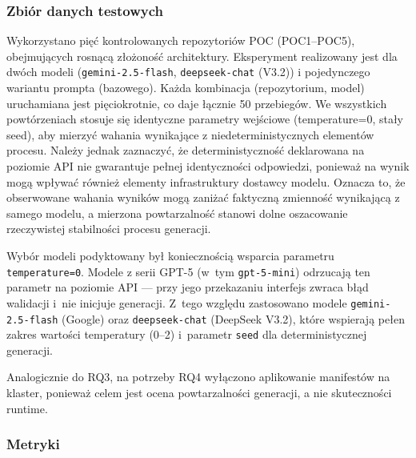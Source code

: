 \subsubsection{Zbiór danych testowych}

Wykorzystano pięć kontrolowanych repozytoriów POC (POC1--POC5), obejmujących rosnącą złożoność architektury. Eksperyment realizowany jest dla dwóch modeli (\texttt{gemini-2.5-flash}, \texttt{deepseek-chat} (V3.2)) i pojedynczego wariantu prompta (bazowego). Każda kombinacja (repozytorium, model) uruchamiana jest pięciokrotnie, co daje łącznie 50 przebiegów. We wszystkich powtórzeniach stosuje się identyczne parametry wejściowe (temperature=0, stały seed), aby mierzyć wahania wynikające z niedeterministycznych elementów procesu. Należy jednak zaznaczyć, że deterministyczność deklarowana na poziomie API nie gwarantuje pełnej identyczności odpowiedzi, ponieważ na wynik mogą wpływać również elementy infrastruktury dostawcy modelu. Oznacza to, że obserwowane wahania wyników mogą zaniżać faktyczną zmienność wynikającą z samego modelu, a mierzona powtarzalność stanowi dolne oszacowanie rzeczywistej stabilności procesu generacji.

Wybór modeli podyktowany był koniecznością wsparcia parametru \texttt{temperature=0}. Modele z serii GPT-5 (w~tym \texttt{gpt-5-mini}) odrzucają ten parametr na poziomie API — przy jego przekazaniu interfejs zwraca błąd walidacji i~nie inicjuje generacji. Z~tego względu zastosowano modele \texttt{gemini-2.5-flash} (Google) oraz \texttt{deepseek-chat} (DeepSeek V3.2), które wspierają pełen zakres wartości temperatury (0--2) i~parametr \texttt{seed} dla deterministycznej generacji.

Analogicznie do RQ3, na potrzeby RQ4 wyłączono aplikowanie manifestów na klaster, ponieważ celem jest ocena powtarzalności generacji, a nie skuteczności runtime.

\subsubsection{Metryki}

